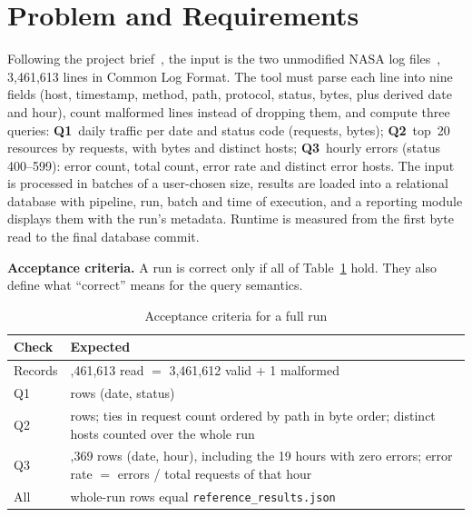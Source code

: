\documentclass[conference]{IEEEtran}
\newcommand{\code}[1]{\texttt{\small #1}}
\begin{document}
\section{Problem and Requirements}
Following the project brief~\cite{brief}, the input is the two unmodified NASA log
files~\cite{nasa}, 3,461,613 lines in Common Log Format. The tool
must parse each line into nine fields (host, timestamp, method, path, protocol, status, bytes,
plus derived date and hour), count malformed lines instead of dropping them, and compute three
queries: \textbf{Q1}~daily traffic per date and status code (requests, bytes); \textbf{Q2}~top~20
resources by requests, with bytes and distinct hosts; \textbf{Q3}~hourly errors (status
400--599): error count, total count, error rate and distinct error hosts. The input is
processed in batches of a user-chosen size, results are loaded into a relational database
with pipeline, run, batch and time of execution, and a reporting module displays them with the
run's metadata. Runtime is measured from the first byte read to the final database commit.

\textbf{Acceptance criteria.} A run is correct only if all of Table~\ref{tab:accept} hold.
They also define what ``correct'' means for the query semantics.

\begin{table}[h]
\caption{Acceptance criteria for a full run}
\label{tab:accept}
\centering
\small
\begin{tabular}{@{}>{\raggedright\arraybackslash}p{}>{\raggedright\arraybackslash}p{}@{}}
\toprule
Check & Expected \\
\midrule
Records & 3,461,613 read $=$ 3,461,612 valid $+$ 1 malformed \\
Q1 & 295 rows (date, status) \\
Q2 & 20 rows; ties in request count ordered by path in byte order; distinct hosts counted over the whole run \\
Q3 & 1,369 rows (date, hour), including the 19 hours with zero errors; error rate $=$ errors / total requests of that hour \\
All & whole-run rows equal \code{reference\_results.json} \\
\bottomrule
\end{tabular}
\end{table}
\end{document}
